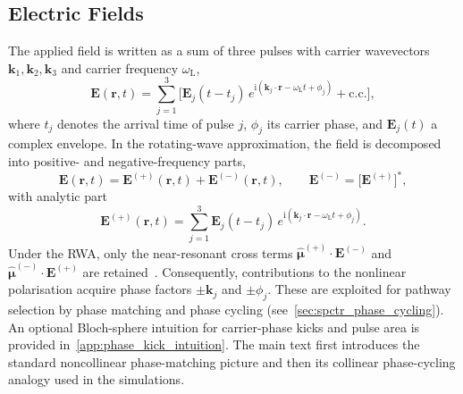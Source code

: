 \subsection{Electric Fields}
\label{subsec:spctr_electric_fields}
The applied field is written as a sum of three pulses with carrier wavevectors $\boldsymbol{k}_1,\boldsymbol{k}_2,\boldsymbol{k}_3$ and carrier frequency $\omega_{\mathrm{L}}$,
\begin{equation}
	\boldsymbol{E}(\boldsymbol{r},t)
	=
	\sum_{j=1}^{3}
	\Big[
	\boldsymbol{E}_j(t-t_j)\,e^{\mathrm{i}(\boldsymbol{k}_j\cdot\boldsymbol{r}-\omega_{\mathrm{L}} t + \phi_j)}
	+ \text{c.c.}
	\Big],
	\label{eq:spctr_E_three_pulses_space}
\end{equation}
where $t_j$ denotes the arrival time of pulse $j$, $\phi_j$ its carrier phase, and $\boldsymbol{E}_j(t)$ a complex envelope.
In the rotating-wave approximation, the field is decomposed into positive- and negative-frequency parts,
\begin{equation}
    \boldsymbol{E}(\boldsymbol{r},t) = \boldsymbol{E}^{(+)}(\boldsymbol{r},t) + \boldsymbol{E}^{(-)}(\boldsymbol{r},t),\qquad
    \boldsymbol{E}^{(-)} = \bigl[\boldsymbol{E}^{(+)}\bigr]^*,
    \label{eq:spctr_E_plusminus}
\end{equation}
with analytic part
\begin{equation*}
	\boldsymbol{E}^{(+)}(\boldsymbol{r},t)
	=
	\sum_{j=1}^{3}
	\boldsymbol{E}_j(t-t_j)\,
	e^{\mathrm{i}(\boldsymbol{k}_j\cdot\boldsymbol{r}-\omega_{\mathrm{L}} t + \phi_j)}.
\end{equation*}
Under the RWA, only the near-resonant cross terms $\hat{\boldsymbol{\mu}}^{(+)}\!\cdot\!\boldsymbol{E}^{(-)}$ and $\hat{\boldsymbol{\mu}}^{(-)}\!\cdot\!\boldsymbol{E}^{(+)}$ are retained~\cite{mukamel1995principlesnonlinearoptical,boyd2008chapter6nonlinear}.
Consequently, contributions to the nonlinear polarisation acquire phase factors $\pm\boldsymbol{k}_j$ and $\pm\phi_j$.
These are exploited for pathway selection by phase matching and phase cycling (see~\autoref{sec:spctr_phase_cycling}).
An optional Bloch-sphere intuition for carrier-phase kicks and pulse area is provided in~\autoref{app:phase_kick_intuition}. The main text first introduces the standard noncollinear phase-matching picture and then its collinear phase-cycling analogy used in the simulations.


